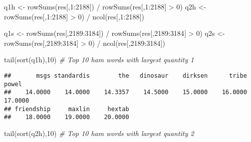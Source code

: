 \documentclass[
]{article}
\newenvironment{Shaded}{\begin{snugshade}}{\end{snugshade}}
\newcommand{\CommentTok}[1]{\textcolor[rgb]{0.56,0.35,0.01}{\textit{#1}}}
\newcommand{\DecValTok}[1]{\textcolor[rgb]{0.00,0.00,0.81}{#1}}
\newcommand{\FunctionTok}[1]{\textcolor[rgb]{0.00,0.00,0.00}{#1}}
\newcommand{\NormalTok}[1]{#1}
\newcommand{\OtherTok}[1]{\textcolor[rgb]{0.56,0.35,0.01}{#1}}
\newcommand{\SpecialCharTok}[1]{\textcolor[rgb]{0.00,0.00,0.00}{#1}}
\begin{document}
\begin{Shaded}
\begin{Highlighting}[]
\NormalTok{q1h }\OtherTok{\textless{}{-}} \FunctionTok{rowSums}\NormalTok{(res[,}\DecValTok{1}\SpecialCharTok{:}\DecValTok{2188}\NormalTok{]) }\SpecialCharTok{/} \FunctionTok{rowSums}\NormalTok{(res[,}\DecValTok{1}\SpecialCharTok{:}\DecValTok{2188}\NormalTok{] }\SpecialCharTok{\textgreater{}} \DecValTok{0}\NormalTok{)}
\NormalTok{q2h }\OtherTok{\textless{}{-}} \FunctionTok{rowSums}\NormalTok{(res[,}\DecValTok{1}\SpecialCharTok{:}\DecValTok{2188}\NormalTok{] }\SpecialCharTok{\textgreater{}} \DecValTok{0}\NormalTok{) }\SpecialCharTok{/} \FunctionTok{ncol}\NormalTok{(res[,}\DecValTok{1}\SpecialCharTok{:}\DecValTok{2188}\NormalTok{])}

\NormalTok{q1s }\OtherTok{\textless{}{-}} \FunctionTok{rowSums}\NormalTok{(res[,}\DecValTok{2189}\SpecialCharTok{:}\DecValTok{3184}\NormalTok{]) }\SpecialCharTok{/} \FunctionTok{rowSums}\NormalTok{(res[,}\DecValTok{2189}\SpecialCharTok{:}\DecValTok{3184}\NormalTok{] }\SpecialCharTok{\textgreater{}} \DecValTok{0}\NormalTok{)}
\NormalTok{q2s }\OtherTok{\textless{}{-}} \FunctionTok{rowSums}\NormalTok{(res[,}\DecValTok{2189}\SpecialCharTok{:}\DecValTok{3184}\NormalTok{] }\SpecialCharTok{\textgreater{}} \DecValTok{0}\NormalTok{) }\SpecialCharTok{/} \FunctionTok{ncol}\NormalTok{(res[,}\DecValTok{2189}\SpecialCharTok{:}\DecValTok{3184}\NormalTok{])}
  
\FunctionTok{tail}\NormalTok{(}\FunctionTok{sort}\NormalTok{(q1h),}\DecValTok{10}\NormalTok{) }\CommentTok{\# Top 10 ham words with largest quantity 1}
\end{Highlighting}
\end{Shaded}

\begin{verbatim}
##       msgs standardis        the   dinosaur    dirksen      tribe      powel 
##    14.0000    14.0000    14.3357    14.5000    15.0000    16.0000    17.0000 
## friendship     maxlin     hextab 
##    18.0000    19.0000    20.0000
\end{verbatim}

\begin{Shaded}
\begin{Highlighting}[]
\FunctionTok{tail}\NormalTok{(}\FunctionTok{sort}\NormalTok{(q2h),}\DecValTok{10}\NormalTok{) }\CommentTok{\# Top 10 ham words with largest quantity 2}
\end{Highlighting}
\end{Shaded}
\end{document}
